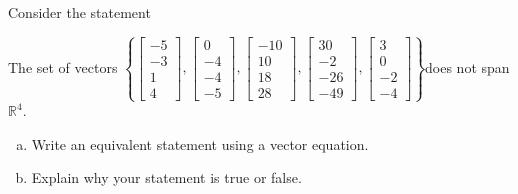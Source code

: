 
\begin{exerciseStatement}


Consider the statement 
\begin{center}\begin{minipage}{0.8\textwidth}
 The set of vectors \( \left\{ \left[\begin{array}{c}
-5 \\
-3 \\
1 \\
4
\end{array}\right] , \left[\begin{array}{c}
0 \\
-4 \\
-4 \\
-5
\end{array}\right] , \left[\begin{array}{c}
-10 \\
10 \\
18 \\
28
\end{array}\right] , \left[\begin{array}{c}
30 \\
-2 \\
-26 \\
-49
\end{array}\right] , \left[\begin{array}{c}
3 \\
0 \\
-2 \\
-4
\end{array}\right] \right\} \)does not span \(\mathbb{R}^4\). 
\end{minipage}\end{center}
    


\begin{enumerate}[(a)]
\item  Write an equivalent statement using a vector equation.
\item  Explain why your statement is true or false.
\end{enumerate}
    
\end{exerciseStatement}
    
